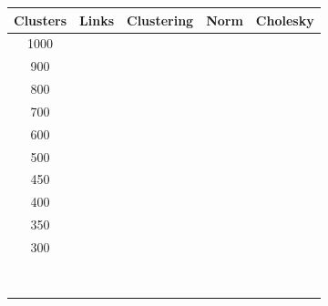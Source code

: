 \begin{table}[H]
    \begin{tabular}{|c|c|c|c|c|}
        \hline
        Clusters & Links & Clustering & Norm & Cholesky \\\hline
        1000     &       &            &      &          \\\hline
        900      &       &            &      &          \\\hline
        800      &       &            &      &          \\\hline
        700      &       &            &      &          \\\hline
        600      &       &            &      &          \\\hline
        500      &       &            &      &          \\\hline
        450      &       &            &      &          \\\hline
        400      &       &            &      &          \\\hline
        350      &       &            &      &          \\\hline
        300      &       &            &      &          \\\hline
                 &       &            &      &          \\\hline
                 &       &            &      &          \\\hline
                 &       &            &      &          \\\hline
                 &       &            &      &          \\\hline
                 &       &            &      &          \\\hline
                 &       &            &      &          \\\hline
                 &       &            &      &          \\\hline
                 &       &            &      &          \\\hline
    \end{tabular}
\end{table}


